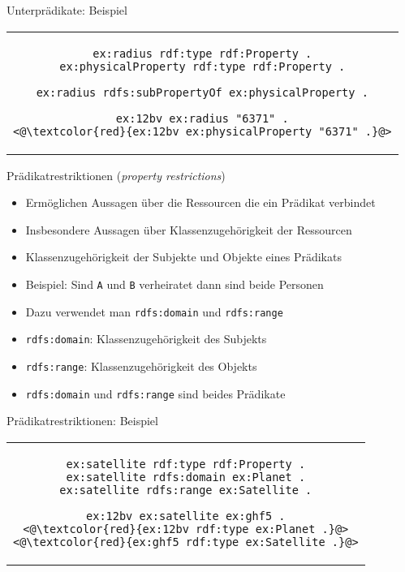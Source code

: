 \documentclass{beamer}
\begin{document}
\begin{frame}[fragile]{Unterprädikate: Beispiel}
	
	\begin{center}
		\begin{tabular}{c}
			\begin{lstlisting}
ex:radius rdf:type rdf:Property .
ex:physicalProperty rdf:type rdf:Property .

ex:radius rdfs:subPropertyOf ex:physicalProperty .

ex:12bv ex:radius "6371" .
<@\textcolor{red}{ex:12bv ex:physicalProperty "6371" .}@>
			\end{lstlisting}
		\end{tabular}
	\end{center}
	
\end{frame}

\begin{frame}{Prädikatrestriktionen (\emph{property restrictions})}
	
	\begin{itemize}
		\item Ermöglichen Aussagen über die Ressourcen die ein Prädikat verbindet
		\item Insbesondere Aussagen über Klassenzugehörigkeit der Ressourcen
		\item Klassenzugehörigkeit der Subjekte und Objekte eines Prädikats
		\item Beispiel: Sind \texttt{A} und \texttt{B} verheiratet dann sind beide Personen
		\item Dazu verwendet man \texttt{rdfs:domain} und \texttt{rdfs:range}
		\item \texttt{rdfs:domain}: Klassenzugehörigkeit des Subjekts
		\item \texttt{rdfs:range}: Klassenzugehörigkeit des Objekts
		\item \texttt{rdfs:domain} und \texttt{rdfs:range} sind beides Prädikate
	\end{itemize}
	
\end{frame}

\begin{frame}[fragile]{Prädikatrestriktionen: Beispiel}
	
	\begin{center}
		\begin{tabular}{c}
			\begin{lstlisting}
ex:satellite rdf:type rdf:Property .
ex:satellite rdfs:domain ex:Planet .
ex:satellite rdfs:range ex:Satellite .

ex:12bv ex:satellite ex:ghf5 .
<@\textcolor{red}{ex:12bv rdf:type ex:Planet .}@>
<@\textcolor{red}{ex:ghf5 rdf:type ex:Satellite .}@>
			\end{lstlisting}
		\end{tabular}
	\end{center}
	
\end{frame}
\end{document}

